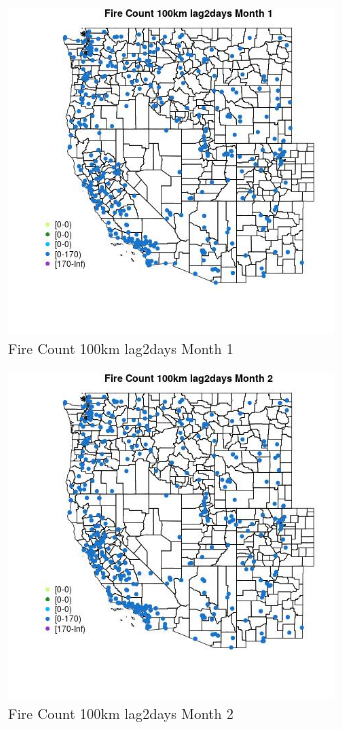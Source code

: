 \begin{figure} 
\centering  
\includegraphics[width=0.77\textwidth]{Code_Outputs/Report_ML_input_PM25_Step4_part_e_de_duplicated_aves_compiled_2019-05-18wNAs_MapObsMo1Fire_Count_100km_lag2days.jpg} 
\caption{\label{fig:Report_ML_input_PM25_Step4_part_e_de_duplicated_aves_compiled_2019-05-18wNAsMapObsMo1Fire_Count_100km_lag2days}Fire Count 100km lag2days Month 1} 
\end{figure} 
 

\clearpage 

\begin{figure} 
\centering  
\includegraphics[width=0.77\textwidth]{Code_Outputs/Report_ML_input_PM25_Step4_part_e_de_duplicated_aves_compiled_2019-05-18wNAs_MapObsMo2Fire_Count_100km_lag2days.jpg} 
\caption{\label{fig:Report_ML_input_PM25_Step4_part_e_de_duplicated_aves_compiled_2019-05-18wNAsMapObsMo2Fire_Count_100km_lag2days}Fire Count 100km lag2days Month 2} 
\end{figure} 
 

